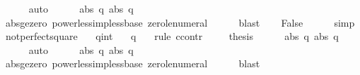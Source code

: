 \begin{isabellebody}
\ \ \ \ \isamarkupfalse%
\ auto\isanewline
\ \ \isamarkupfalse%
\ {\isachardoublequoteopen}{}\ {\isacharless}\ abs\ q{\isachardoublequoteclose}\ {\isachardoublequoteopen}abs\ q\ {\isacharless}\ {}{\isachardoublequoteclose}\isanewline
\ \ \ \ \isamarkupfalse%
\ abs{\isacharunderscore}ge{\isacharunderscore}zero\ power{\isacharunderscore}less{\isacharunderscore}imp{\isacharunderscore}less{\isacharunderscore}base\ zero{\isacharunderscore}le{\isacharunderscore}numeral\isanewline
\ \ \ \ \isamarkupfalse%
\ blast{\isacharplus}\isanewline
\ \ \isamarkupfalse%
\ False\isanewline
\ \ \ \ \isamarkupfalse%
\ simp\isanewline
{}\isamarkupfalse%
%
\endisatagproof
{\isafoldproof}%
%
\isadelimproof
\isanewline
%
\endisadelimproof
\isanewline
{}\isamarkupfalse%
\ not{\isacharunderscore}perfect{\isacharunderscore}square{\isacharunderscore}{}{\isacharcolon}\isanewline
\ \ \ q{\isacharcolon}{\isacharcolon}int\isanewline
\ \ \ {\isachardoublequoteopen}q{\isacharcircum}{}\ {\isasymnoteq}\ {}{\isachardoublequoteclose}\isanewline
%
\isadelimproof
%
\endisadelimproof
%
\isatagproof
{}\isamarkupfalse%
\ {\isacharparenleft}rule\ ccontr{\isacharparenright}\isanewline
\ \ \isamarkupfalse%
\ {\isachardoublequoteopen}{\isasymnot}\ {\isacharquery}thesis{\isachardoublequoteclose}\isanewline
\ \ \isamarkupfalse%
\ {\isachardoublequoteopen}{}{\isacharcircum}{}\ {\isacharless}\ {\isacharparenleft}abs\ q{\isacharparenright}{\isacharcircum}{}{\isachardoublequoteclose}\ {\isachardoublequoteopen}{\isacharparenleft}abs\ q{\isacharparenright}{\isacharcircum}{}\ {\isacharless}\ {}{\isacharcircum}{}{\isachardoublequoteclose}\isanewline
\ \ \ \ \isamarkupfalse%
\ auto\isanewline
\ \ \isamarkupfalse%
\ {\isachardoublequoteopen}{}\ {\isacharless}\ abs\ q{\isachardoublequoteclose}\ {\isachardoublequoteopen}abs\ q\ {\isacharless}\ {}{\isachardoublequoteclose}\isanewline
\ \ \ \ \isamarkupfalse%
\ abs{\isacharunderscore}ge{\isacharunderscore}zero\ power{\isacharunderscore}less{\isacharunderscore}imp{\isacharunderscore}less{\isacharunderscore}base\ zero{\isacharunderscore}le{\isacharunderscore}numeral\isanewline
\ \ \ \ \isamarkupfalse%
\ blast{\isacharplus}\isanewline
\ \ \isamarkupfalse%

\end{isabellebody}

